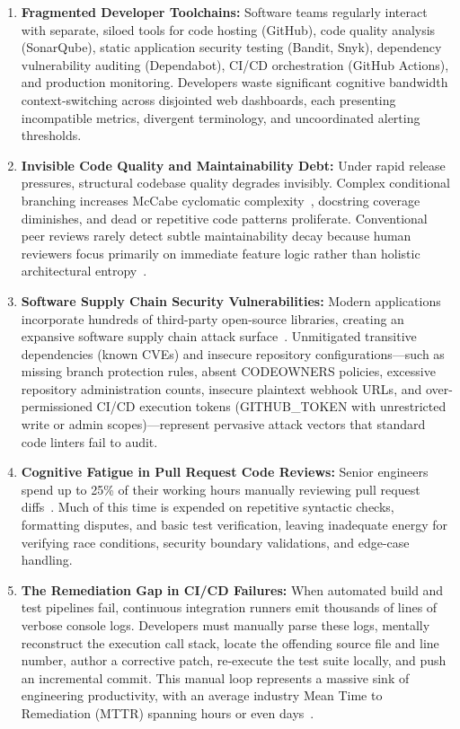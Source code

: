 \documentclass[12pt,a4paper,oneside]{report}
\begin{document}
\begin{enumerate}
    \item \textbf{Fragmented Developer Toolchains:} Software teams regularly interact with separate, siloed tools for code hosting (GitHub), code quality analysis (SonarQube), static application security testing (Bandit, Snyk), dependency vulnerability auditing (Dependabot), CI/CD orchestration (GitHub Actions), and production monitoring. Developers waste significant cognitive bandwidth context-switching across disjointed web dashboards, each presenting incompatible metrics, divergent terminology, and uncoordinated alerting thresholds.
    \item \textbf{Invisible Code Quality and Maintainability Debt:} Under rapid release pressures, structural codebase quality degrades invisibly. Complex conditional branching increases McCabe cyclomatic complexity~\cite{mccabe1976complexity}, docstring coverage diminishes, and dead or repetitive code patterns proliferate. Conventional peer reviews rarely detect subtle maintainability decay because human reviewers focus primarily on immediate feature logic rather than holistic architectural entropy~\cite{mcintosh2016empirical}.
    \item \textbf{Software Supply Chain Security Vulnerabilities:} Modern applications incorporate hundreds of third-party open-source libraries, creating an expansive software supply chain attack surface~\cite{srikant2022software}. Unmitigated transitive dependencies (known CVEs) and insecure repository configurations---such as missing branch protection rules, absent CODEOWNERS policies, excessive repository administration counts, insecure plaintext webhook URLs, and over-permissioned CI/CD execution tokens (GITHUB\_TOKEN with unrestricted write or admin scopes)---represent pervasive attack vectors that standard code linters fail to audit.
    \item \textbf{Cognitive Fatigue in Pull Request Code Reviews:} Senior engineers spend up to 25\% of their working hours manually reviewing pull request diffs~\cite{alhajji2021evaluating}. Much of this time is expended on repetitive syntactic checks, formatting disputes, and basic test verification, leaving inadequate energy for verifying race conditions, security boundary validations, and edge-case handling.
    \item \textbf{The Remediation Gap in CI/CD Failures:} When automated build and test pipelines fail, continuous integration runners emit thousands of lines of verbose console logs. Developers must manually parse these logs, mentally reconstruct the execution call stack, locate the offending source file and line number, author a corrective patch, re-execute the test suite locally, and push an incremental commit. This manual loop represents a massive sink of engineering productivity, with an average industry Mean Time to Remediation (MTTR) spanning hours or even days~\cite{morrison2018challenges}.
\end{enumerate}
\end{document}
